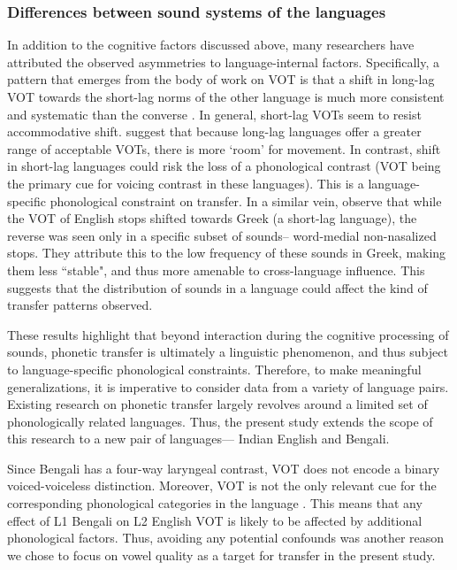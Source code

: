\documentclass[12 pt]{article}
\begin{document}
\subsubsection*{Differences between sound systems of the languages} \label{sound systems} In addition to the cognitive factors discussed above, many researchers have attributed the observed asymmetries to language-internal factors. Specifically, a pattern that emerges from the body of work on VOT is that a shift in long-lag VOT towards the short-lag norms of the other language is much more consistent and systematic than the converse \citep{tobin2017phonetic, olson2016role,bullock2009trying,antoniou2011inter,chang2012rapid}. In general, short-lag VOTs seem to resist accommodative shift. \cite{bullock2009trying} suggest that because long-lag languages offer a greater range of acceptable VOTs, there is more `room' for movement. In contrast, shift in short-lag languages could risk the loss of a phonological contrast (VOT being the primary cue for voicing contrast in these languages).  This is a language-specific phonological constraint on transfer.
In a similar vein, \cite{antoniou2011inter} observe that while the VOT of English stops shifted towards Greek (a short-lag language), the reverse was seen only in a specific subset of sounds-- word-medial non-nasalized stops. They attribute this to the low frequency of these sounds in Greek, making them less ``stable", and thus more amenable to cross-language influence. This suggests that the distribution of sounds in a language could affect the kind of transfer patterns observed.

These results highlight that beyond interaction during the cognitive processing of sounds, phonetic transfer is ultimately a linguistic phenomenon, and thus subject to language-specific phonological constraints. Therefore, to make meaningful generalizations, it is imperative to consider data from a variety of language pairs. Existing research on phonetic transfer largely revolves around a limited set of phonologically related languages. Thus, the present study extends the scope of this research to a new pair of languages--- Indian English and Bengali.

Since Bengali has a four-way laryngeal contrast, VOT does not encode a binary voiced-voiceless distinction. Moreover, VOT is not the only relevant cue for the corresponding phonological categories in the language \citep{dmitrieva2020acoustic}. This means that any effect of L1 Bengali on L2 English VOT is likely to be affected by additional phonological factors. Thus, avoiding any potential confounds was another reason we chose to focus on vowel quality as a target for transfer in the present study. 
\end{document}
